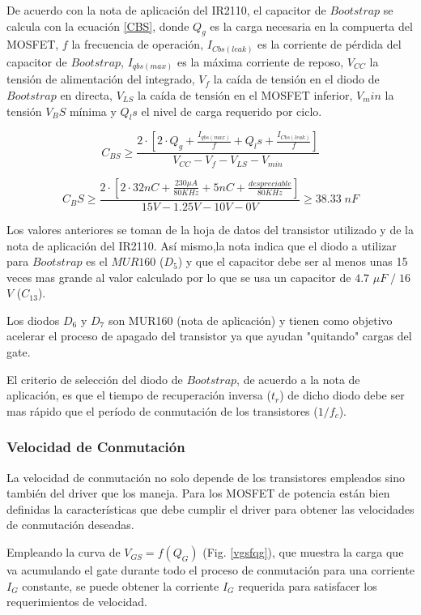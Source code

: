 \documentclass[11pt, a4paper]{article}
\begin{document}
De acuerdo con la nota de aplicación del IR2110, el capacitor de $Bootstrap$ se calcula con la ecuación \ref{CBS}, donde $Q_g$ es la carga necesaria en la compuerta del MOSFET, $f$ la frecuencia de operación, $I_{Cbs(leak)}$  es la corriente de pérdida del capacitor de $Bootstrap$, $I_{qbs(max)}$ es la máxima corriente de reposo, $V_{CC}$ la tensión de alimentación del integrado, $V_f$ la caída de tensión en el diodo de $Bootstrap$ en directa, $V_{LS}$ la caída de tensión en el MOSFET inferior, $V_min$ la tensión $V_BS$ mínima y $Q_ls$ el nivel de carga requerido por ciclo.

\begin{equation}
C_{BS} \geq \frac{ 2 \cdot [2\cdot Q_g + \frac{I_{qbs(max)}}{f} + Q_ls + \frac{I_{Cbs(leak)}}{f}]}{V_{CC} - V_f - V_{LS} - V_{min}}
\label{CBS} 
\end{equation}

\[ C_BS \geq \frac{ 2 \cdot [2\cdot 32nC + \frac{230 \mu A}{80 KHz} + 5 nC + \frac{despreciable}{80 KHz}]}{15 V - 1.25 V - 10 V - 0 V} \geq 38.33 \; nF \]

Los valores anteriores se toman de la hoja de datos del transistor utilizado y de la nota de aplicación del IR2110. Así mismo,la nota indica que el diodo a utilizar para $Bootstrap$ es el $MUR160$ ($D_5$) y que el capacitor debe ser al menos unas 15 veces mas grande al valor calculado por lo que se usa un capacitor de $4.7$ $\mu F\; /\; 16$ $V$ ($C_{13}$).

Los diodos $D_6$ y $D_7$ son MUR160 (nota de aplicación) y tienen como objetivo acelerar el proceso de apagado del transistor ya que ayudan "quitando" cargas del gate.

El criterio de selección del diodo de $Bootstrap$, de acuerdo a la nota de aplicación, es que el tiempo de recuperación inversa ($t_r$) de dicho diodo debe ser mas rápido que el período de conmutación de los transistores ($1/f_c$).

\subsubsection{Velocidad de Conmutación}
La velocidad de conmutación no solo depende de los transistores empleados sino también del driver que los maneja. Para los MOSFET de potencia están bien definidas la características que debe cumplir el driver para obtener las velocidades de conmutación deseadas.

Empleando la curva de $V_{GS} = f(Q_G)$ (Fig. \ref{vgsfqg}), que muestra la carga que va acumulando el gate durante todo el proceso de conmutación para una corriente $I_G$ constante, se puede obtener la corriente $I_G$ requerida para satisfacer los requerimientos de velocidad.
\end{document}
